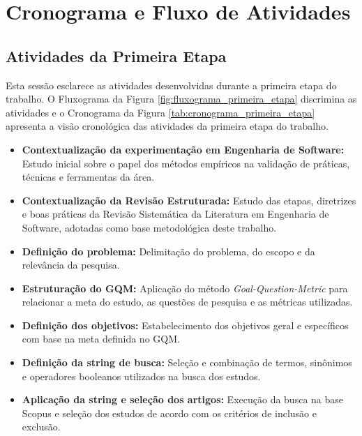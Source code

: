 \section{Cronograma e Fluxo de Atividades}

\subsection{Atividades da Primeira Etapa}

Esta sessão esclarece as atividades desenvolvidas durante a primeira etapa do trabalho. O Fluxograma da Figura \ref{fig:fluxograma_primeira_etapa} discrimina as atividades e o Cronograma da Figura \ref{tab:cronograma_primeira_etapa} apresenta a visão cronológica das atividades da primeira etapa do trabalho.

\begin{itemize}

\item \textbf{Contextualização da experimentação em Engenharia de Software:}
Estudo inicial sobre o papel dos métodos empíricos na validação de práticas, técnicas e ferramentas da área.

\item \textbf{Contextualização da Revisão Estruturada:}
Estudo das etapas, diretrizes e boas práticas da Revisão Sistemática da Literatura em Engenharia de Software, adotadas como base metodológica deste trabalho.

\item \textbf{Definição do problema:}
Delimitação do problema, do escopo e da relevância da pesquisa.

\item \textbf{Estruturação do GQM:}
Aplicação do método \textit{Goal-Question-Metric} para relacionar a meta do estudo, as questões de pesquisa e as métricas utilizadas.

\item \textbf{Definição dos objetivos:}
Estabelecimento dos objetivos geral e específicos com base na meta definida no GQM.

\item \textbf{Definição da string de busca:}
Seleção e combinação de termos, sinônimos e operadores booleanos utilizados na busca dos estudos.

\item \textbf{Aplicação da string e seleção dos artigos:}
Execução da busca na base Scopus e seleção dos estudos de acordo com os critérios de inclusão e exclusão.


\end{itemize}
